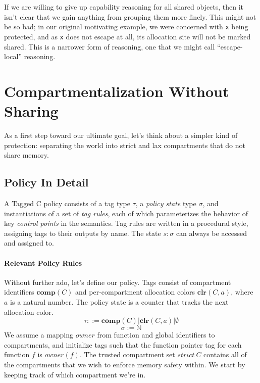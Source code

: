 \documentclass{article}
\begin{document}
If we are willing to give up capability reasoning for all shared objects, then it isn't clear
that we gain anything from grouping them more finely. This might not be so bad; in our original
motivating example, we were concerned with {\tt x} being protected, and as {\tt x} does not escape
at all, its allocation site will not be marked shared. This is a narrower form of reasoning, one
that we might call ``escape-local'' reasoning.

\section{Compartmentalization Without Sharing}

As a first step toward our ultimate goal, let's think about a simpler kind of protection:
separating the world into strict and lax compartments that do not share memory.

\subsection{Policy In Detail}

A Tagged C policy consists of a tag type \(\tau\), a {\it policy state} type \(\sigma\),
and instantiations of a set of {\it tag rules}, each of which parameterizes the behavior
of key {\it control points} in the semantics. Tag rules are written in a procedural style,
assigning tags to their outputs by name. The state \(s : \sigma\) can always be accessed
and assigned to.

\paragraph{Relevant Policy Rules}

Without further ado, let's define our policy. Tags consist of compartment identifiers
\(\mathbf{comp}(C)\) and per-compartment allocation colors \(\mathbf{clr}(C,a)\), where
\(a\) is a natural number. The policy state is a counter that tracks the next allocation color.
\[\tau ::= \mathbf{comp}(C) | \mathbf{clr}(C,a) | \emptyset \]
\[\sigma := \mathbb{N} \]
We assume a mapping \(owner\) from function and global identifiers to compartments,
and initialize tags such that the function pointer tag for each function \(f\) is \(owner(f)\).
The trusted compartment set \(\mathit{strict} ~ C\) contains all of the compartments that
we wish to enforce memory safety within. We start by keeping track of which compartment we're in.
\end{document}
